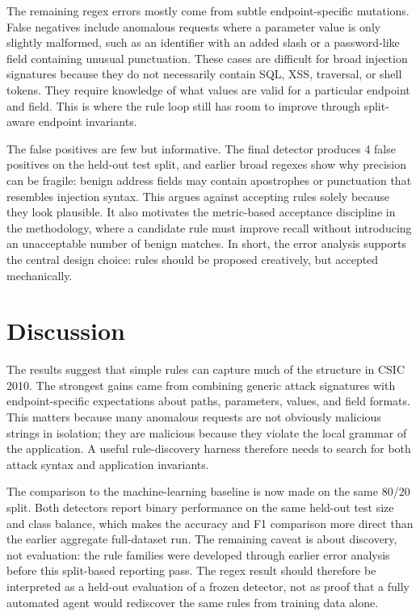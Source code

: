 \documentclass[letterpaper,twocolumn,10pt]{article}
\begin{document}
The remaining regex errors mostly come from subtle endpoint-specific mutations. False negatives include anomalous requests where a parameter value is only slightly malformed, such as an identifier with an added slash or a password-like field containing unusual punctuation. These cases are difficult for broad injection signatures because they do not necessarily contain SQL, XSS, traversal, or shell tokens. They require knowledge of what values are valid for a particular endpoint and field. This is where the rule loop still has room to improve through split-aware endpoint invariants.

The false positives are few but informative. The final detector produces 4 false positives on the held-out test split, and earlier broad regexes show why precision can be fragile: benign address fields may contain apostrophes or punctuation that resembles injection syntax. This argues against accepting rules solely because they look plausible. It also motivates the metric-based acceptance discipline in the methodology, where a candidate rule must improve recall without introducing an unacceptable number of benign matches. In short, the error analysis supports the central design choice: rules should be proposed creatively, but accepted mechanically.

\section{Discussion}

The results suggest that simple rules can capture much of the structure in CSIC 2010. The strongest gains came from combining generic attack signatures with endpoint-specific expectations about paths, parameters, values, and field formats. This matters because many anomalous requests are not obviously malicious strings in isolation; they are malicious because they violate the local grammar of the application. A useful rule-discovery harness therefore needs to search for both attack syntax and application invariants.

The comparison to the machine-learning baseline is now made on the same 80/20 split. Both detectors report binary performance on the same held-out test size and class balance, which makes the accuracy and F1 comparison more direct than the earlier aggregate full-dataset run. The remaining caveat is about discovery, not evaluation: the rule families were developed through earlier error analysis before this split-based reporting pass. The regex result should therefore be interpreted as a held-out evaluation of a frozen detector, not as proof that a fully automated agent would rediscover the same rules from training data alone.
\end{document}

